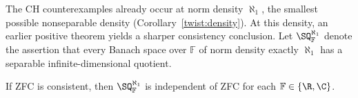 The CH counterexamples already occur at norm density $\aleph_1$, the
smallest possible nonseparable density (Corollary~\ref{twist:density}).
At this density, an earlier positive theorem yields a sharper consistency
conclusion. Let $\SQ^{\aleph_1}_{\mathbb F}$ denote the assertion that
every Banach space over $\mathbb F$ of norm density exactly $\aleph_1$
has a separable infinite-dimensional quotient.

\begin{corollary}\label{intro:small-density}
If ZFC is consistent, then $\SQ^{\aleph_1}_{\mathbb F}$ is independent
of ZFC for each $\mathbb F\in\{\R,\C\}$.
\end{corollary}
